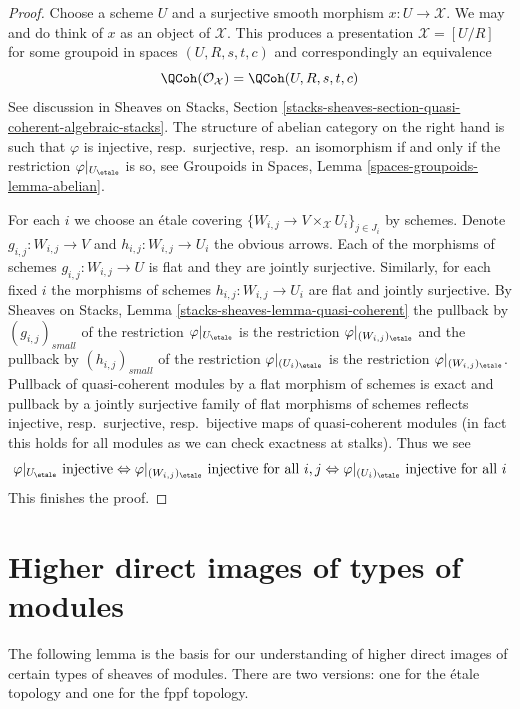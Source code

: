 \begin{proof}
Choose a scheme $U$ and a surjective smooth morphism
$x : U \to \mathcal{X}$. We may and do think of $x$
as an object of $\mathcal{X}$.
This produces a presentation $\mathcal{X} = [U/R]$ for some groupoid
in spaces $(U, R, s, t, c)$ and correspondingly an equivalence
$$
\QCoh(\mathcal{O}_\mathcal{X}) = \QCoh(U, R, s, t, c)
$$
See discussion in Sheaves on Stacks, Section
\ref{stacks-sheaves-section-quasi-coherent-algebraic-stacks}.
The structure of abelian category on the right hand is such that $\varphi$
is injective, resp.\ surjective, resp.\ an isomorphism
if and only if the restriction $\varphi|_{U_\etale}$ is so, see
Groupoids in Spaces, Lemma \ref{spaces-groupoids-lemma-abelian}.

\medskip\noindent
For each $i$ we choose an \'etale covering
$\{W_{i, j} \to V \times_\mathcal{X} U_i\}_{j \in J_i}$
by schemes. Denote $g_{i, j} : W_{i, j} \to V$ and
$h_{i, j} : W_{i, j} \to U_i$ the obvious arrows.
Each of the morphisms of schemes $g_{i, j} : W_{i, j} \to U$ is flat
and they are jointly surjective.
Similarly, for each fixed $i$ the morphisms of schemes
$h_{i, j} : W_{i, j} \to U_i$ are flat and jointly surjective.
By Sheaves on Stacks, Lemma \ref{stacks-sheaves-lemma-quasi-coherent}
the pullback by $(g_{i, j})_{small}$ of the restriction
$\varphi|_{U_\etale}$ is the restriction $\varphi|_{(W_{i, j})_\etale}$
and the pullback by $(h_{i, j})_{small}$ of the restriction
$\varphi|_{(U_i)_\etale}$ is the restriction $\varphi|_{(W_{i, j})_\etale}$.
Pullback of quasi-coherent modules by a flat morphism of schemes is exact
and pullback by a jointly surjective family of flat morphisms of schemes
reflects injective, resp.\ surjective, resp.\ bijective maps
of quasi-coherent modules (in fact this holds for all modules
as we can check exactness at stalks). Thus we see
$$
\varphi|_{U_\etale} \text{ injective}
\Leftrightarrow
\varphi|_{(W_{i, j})_\etale} \text{ injective for all }i, j
\Leftrightarrow
\varphi|_{(U_i)_\etale} \text{ injective for all }i
$$
This finishes the proof.
\end{proof}

\section{Higher direct images of types of modules}
\label{stacks-cohomology-section-key}
The following lemma is the basis for our understanding of
higher direct images of certain types of sheaves of modules.
There are two versions: one for the \'etale topology and
one for the fppf topology.

